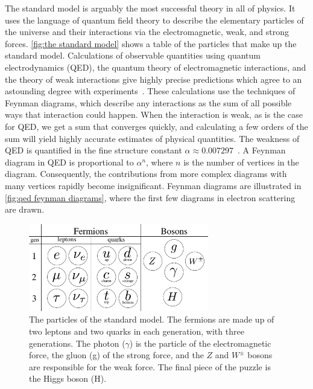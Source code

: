 The standard model is arguably the most successful theory in all of physics.
It uses the language of quantum field theory to describe the elementary particles of the universe and their interactions via the electromagnetic, weak, and strong forces.
\autoref{fig:the standard model} shows a table of the particles that make up the standard model.
Calculations of observable quantities using quantum electrodynamics (QED), the quantum theory of electromagnetic interactions, and the theory of weak interactions give highly precise predictions which agree to an astounding degree with experiments~\cite{Schwartz:QFT}.
These calculations use the techniques of Feynman diagrams, which describe any interactions as the sum of all possible ways that interaction could happen.
When the interaction is weak, as is the case for QED, we get a sum that converges quickly, and calculating a few orders of the sum will yield highly accurate estimates of physical quantities.
The weakness of QED is quantified in the fine structure constant $\alpha \approx 0.00 7297$~\cite{PDG}.
A Feynman diagram in QED is proportional to $\alpha^n$, where $n$ is the number of vertices in the diagram.
Consequently, the contributions from more complex diagrams with many vertices rapidly become insignificant.
Feynman diagrams are illustrated in \autoref{fig:qed feynman diagrams}, where the first few diagrams in electron scattering are drawn.

\begin{figure}[h]
    \centering
    \includegraphics[width=0.7\textwidth]{figurer/standard_model2.pdf}
    \caption{The particles of the standard model. The fermions are made up of two leptons and two quarks in each generation, with three generations. The photon ($\gamma$) is the particle of the electromagnetic force, the gluon (g) of the strong force, and the $Z$ and $W^\pm$ bosons are responsible for the weak force. The final piece of the puzzle is the Higgs boson (H).}
    \label{fig:the standard model}
\end{figure}

